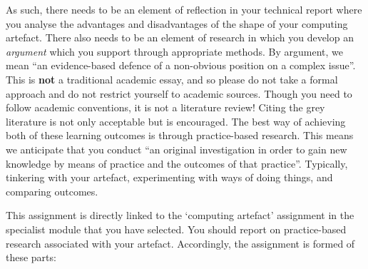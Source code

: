 \documentclass{../../fal_assignment}
\begin{document}
As such, there needs to be an element of reflection in your technical report where you analyse the advantages and disadvantages of the shape of  your computing artefact. There also needs to be an element of research in which you develop an \textit{argument} which you support through appropriate methods. By argument,
we mean ``an evidence-based defence of a non-obvious position on a complex issue''. This is \textbf{not} a traditional academic essay, and so please do not take a formal approach and do not restrict yourself to academic sources. Though you need to follow academic conventions, it is not a literature review! Citing the grey literature is not only acceptable but is encouraged. The best way of achieving both of these learning outcomes is through practice-based research. This means we anticipate that you conduct ``an original investigation in order to gain new knowledge by means of practice and the outcomes of that practice''. Typically, tinkering with your artefact, experimenting with ways of doing things, and comparing outcomes.

This assignment is directly linked to the `computing artefact' assignment in the specialist module that you have selected. You should report on practice-based research associated with your artefact. Accordingly, the assignment is formed of these parts:
\end{document}
